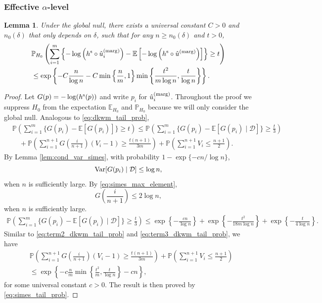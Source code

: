 \documentclass[11pt]{article}
\newtheorem{lemma}{Lemma}
\newcommand{\Var}{\textnormal{Var}}
\def\E{\mathbb{E}}
\def\marg{\textnormal{(marg)}}
\def\simes{\textnormal{s}}
\renewcommand{\P}{\mathbb{P}}
\newcommand{\D}{\mathcal{D}}
\newcommand{\lb}{\left(}
\newcommand{\rb}{\right)}
\begin{document}
\subsubsection{Effective $\alpha$-level}
\begin{lemma}\label{lem:fisher_simes_tail}
  Under the global null, there exists a universal constant $C > 0$ and $n_0(\delta)$ that only depends on $\delta$, such that for any $n\ge n_0(\delta)$ and $t > 0$,
  \begin{align*}
    &\P_{H_0}\lb \sum_{i=1}^{m}\left\{-\log\lb h^{\simes} \circ \hat{u}^\marg_i\rb - \E\left[-\log\lb h^{\simes} \circ \hat{u}^\marg\rb\right]\right\}\ge t\rb\\
    & \le \exp\left\{-C\frac{n}{\log n} - C\min\left\{\frac{n}{m}, 1\right\}\min\left\{\frac{t^2}{m\log n}, \frac{t}{\log n}\right\}\right\}.
  \end{align*}
\end{lemma}
\begin{proof}
  Let $G(p) = -\log (h^\simes(p))$ and write $p_i$ for $\hat{u}^\marg_i$. Throughout the proof we suppress $H_0$ from the expectation $\E_{H_0}$ and $\P_{H_0}$ because we will only consider the global null. Analogous to \eqref{eq:dkwm_tail_prob},
  \begin{align}
    &\P\lb \sum_{i=1}^{m}\{G(p_i) - \E[G(p_i)]\}\ge t\rb\le     \P\lb \sum_{i=1}^{m}\{G(p_i) - \E[G(p_i)\mid \D]\}\ge \frac{t}{3}\rb\nonumber\\
    & \quad + \P\lb \sum_{i=1}^{n+1}G\left(\frac{i}{n+1}\right)(V_{i} - 1)\ge \frac{t(n+1)}{3m}\rb + \P\lb \sum_{i=1}^{n+1}V_{i} \le \frac{n+1}{2}\rb\label{eq:simes_tail_prob}.
  \end{align}
  By Lemma \ref{lem:cond_var_simes}, with probability $1 - \exp\{-cn/\log n\}$, 
  \[\Var[G(p_i)\mid \D] \le \log n,\]
  when $n$ is sufficiently large. By \eqref{eq:simes_max_element},
  \[G\lb\frac{i}{n+1}\rb\le 2\log n,\]
  when $n$ is sufficiently large.  
  \begin{align*}
    \P\lb \sum_{i=1}^{m}\{G(p_i) - \E[G(p_i)\mid \D]\}\ge \frac{t}{3}\rb\le \exp\left\{-\frac{cn}{\log n}\right\} + \exp \left\{-\frac{t^2}{18m\log n}\right\} + \exp\left\{-\frac{t}{4\log n}\right\}.
  \end{align*}
  Similar to \eqref{eq:term2_dkwm_tail_prob} and \eqref{eq:term3_dkwm_tail_prob}, we have
  \begin{align*}
    &\P\lb \sum_{i=1}^{n+1}G\left(\frac{i}{n+1}\right)(V_{i} - 1)\ge \frac{t(n+1)}{3m}\rb + \P\lb \sum_{i=1}^{n+1}V_{i} \le \frac{n+1}{2}\rb\\
    & \le \exp\left\{-c\frac{n}{m}\min\left\{\frac{t^2}{m}, \frac{t}{\log n}\right\} - cn\right\},
  \end{align*}
  for some universal constant $c > 0$. The result is then proved by \eqref{eq:simes_tail_prob}.
\end{proof}
\end{document}
